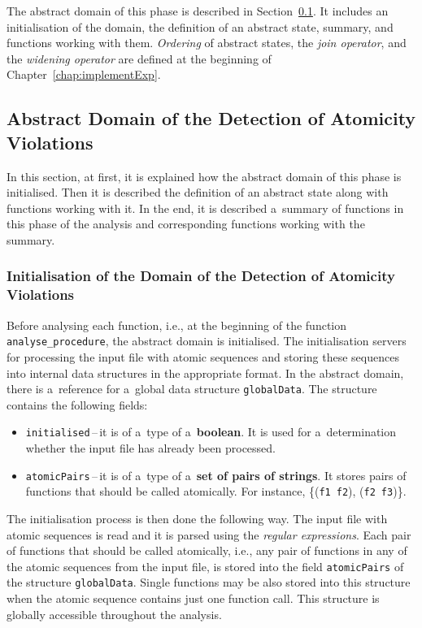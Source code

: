 The abstract domain of this phase is described in
Section~\ref{sec:implementPhase2Domain}. It includes an initialisation
of the domain, the definition of an abstract state, summary, and functions
working with them. \emph{Ordering} of abstract states, the \emph{join
operator}, and the \emph{widening operator} are defined at the beginning of
Chapter~\ref{chap:implementExp}.


\subsection{Abstract Domain of the Detection of Atomicity Violations}
\label{sec:implementPhase2Domain}

In this section, at first, it is explained how the abstract domain of this
phase is initialised. Then it is described the definition of an abstract
state along with functions working with it. In the end, it is described
a~summary of functions in this phase of the analysis and corresponding
functions working with the summary.

\subsubsection{%
    Initialisation of the Domain of the Detection of Atomicity Violations
}

Before analysing each function, i.e., at the beginning of the function
\texttt{analyse\_procedure}, the abstract domain is initialised. The
initialisation servers for processing the input file with atomic sequences
and storing these sequences into internal data structures in the
appropriate format. In the abstract domain, there is a~reference for
a~global data structure \texttt{globalData}. The structure contains the
following fields:
\begin{itemize}
    \item
        \texttt{initialised}\,--\,it is of a~type of a~\textbf{boolean}. It
        is used for a~determination whether the input file has already been
        processed.

    \item
        \texttt{atomicPairs}\,--\,it is of a~type of a~\textbf{set of pairs
        of strings}. It stores pairs of functions that should be called
        atomically. For instance, \{(\texttt{f1}~\texttt{f2}),
        (\texttt{f2}~\texttt{f3})\}.
\end{itemize}

The initialisation process is then done the following way. The input file
with atomic sequences is read and it is parsed using the \emph{regular
expressions}. Each pair of functions that should be called atomically,
i.e., any pair of functions in any of the atomic sequences from the input
file, is stored into the field \texttt{atomicPairs} of the structure
\texttt{globalData}. Single functions may be also stored into this
structure when the atomic sequence contains just one function call.
This structure is globally accessible throughout the analysis.

